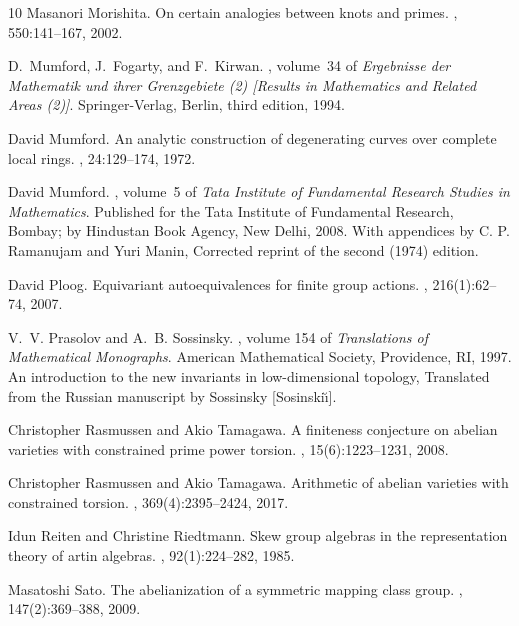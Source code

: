 \documentclass[10pt]{amsart}
\theoremstyle{definition}
\begin{document}
\begin{thebibliography}{10}
Masanori Morishita.
\newblock On certain analogies between knots and primes.
, 550:141--167, 2002.

D.~Mumford, J.~Fogarty, and F.~Kirwan.
, volume~34 of {\em Ergebnisse der
  Mathematik und ihrer Grenzgebiete (2) [Results in Mathematics and Related
  Areas (2)]}.
\newblock Springer-Verlag, Berlin, third edition, 1994.

David Mumford.
\newblock An analytic construction of degenerating curves over complete local
  rings.
, 24:129--174, 1972.

David Mumford.
, volume~5 of {\em Tata Institute of
  Fundamental Research Studies in Mathematics}.
\newblock Published for the Tata Institute of Fundamental Research, Bombay; by
  Hindustan Book Agency, New Delhi, 2008.
\newblock With appendices by C. P. Ramanujam and Yuri Manin, Corrected reprint
  of the second (1974) edition.

David Ploog.
\newblock Equivariant autoequivalences for finite group actions.
, 216(1):62--74, 2007.

V.~V. Prasolov and A.~B. Sossinsky.
, volume 154 of {\em
  Translations of Mathematical Monographs}.
\newblock American Mathematical Society, Providence, RI, 1997.
\newblock An introduction to the new invariants in low-dimensional topology,
  Translated from the Russian manuscript by Sossinsky [Sosinski{\u\i}].

Christopher Rasmussen and Akio Tamagawa.
\newblock A finiteness conjecture on abelian varieties with constrained prime
  power torsion.
, 15(6):1223--1231, 2008.

Christopher Rasmussen and Akio Tamagawa.
\newblock Arithmetic of abelian varieties with constrained torsion.
, 369(4):2395--2424, 2017.

Idun Reiten and Christine Riedtmann.
\newblock Skew group algebras in the representation theory of artin algebras.
, 92(1):224--282, 1985.

Masatoshi Sato.
\newblock The abelianization of a symmetric mapping class group.
, 147(2):369–388, 2009.


\end{thebibliography}
\end{document}
